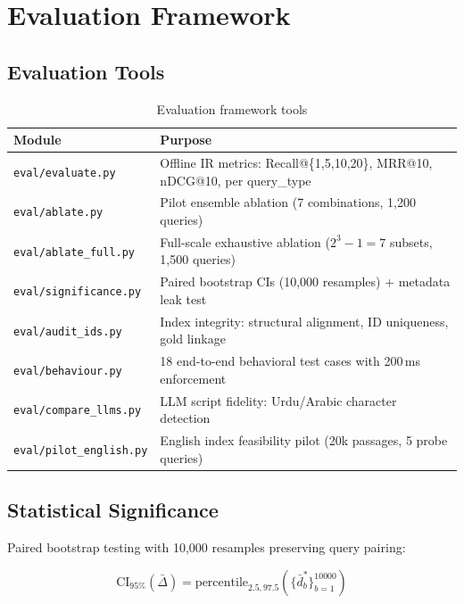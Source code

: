 \documentclass[12pt,a4paper]{article}
\begin{document}
\section{Evaluation Framework}

\subsection{Evaluation Tools}

\begin{table}[H]
\centering
\small
\begin{tabularx}{\textwidth}{l X}
\toprule
\textbf{Module} & \textbf{Purpose} \\
\midrule
\texttt{eval/evaluate.py}       & Offline IR metrics: Recall@\{1,5,10,20\}, MRR@10, nDCG@10, per query\_type \\
\texttt{eval/ablate.py}         & Pilot ensemble ablation (7 combinations, 1,200 queries) \\
\texttt{eval/ablate\_full.py}   & Full-scale exhaustive ablation ($2^3-1=7$ subsets, 1,500 queries) \\
\texttt{eval/significance.py}   & Paired bootstrap CIs (10,000 resamples) + metadata leak test \\
\texttt{eval/audit\_ids.py}     & Index integrity: structural alignment, ID uniqueness, gold linkage \\
\texttt{eval/behaviour.py}      & 18 end-to-end behavioral test cases with 200\,ms enforcement \\
\texttt{eval/compare\_llms.py}  & LLM script fidelity: Urdu/Arabic character detection \\
\texttt{eval/pilot\_english.py} & English index feasibility pilot (20k passages, 5 probe queries) \\
\bottomrule
\end{tabularx}
\caption{Evaluation framework tools}
\end{table}

\subsection{Statistical Significance}

Paired bootstrap testing with 10,000 resamples preserving query pairing:

$$\text{CI}_{95\%}(\bar{\Delta}) = \text{percentile}_{2.5, 97.5}\left(\{\bar{d}_b^*\}_{b=1}^{10000}\right)$$
\end{document}
